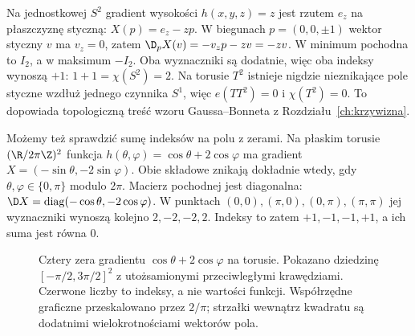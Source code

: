 \begin{przyklad}
Na jednostkowej $S^2$ gradient wysokości $h(x,y,z)=z$
jest rzutem $e_z$ na płaszczyznę styczną:
$X(p)=e_z-zp$. W biegunach $p=(0,0,\pm1)$ wektor
styczny $v$ ma $v_z=0$, zatem
$\D_pX(v)=-v_zp-zv=-zv$.
W minimum pochodna to $I_2$, a w maksimum $-I_2$.
Oba wyznaczniki są dodatnie, więc oba indeksy wynoszą $+1$:
$1+1=\chi(S^2)=2$.
Na torusie $T^2$
istnieje nigdzie
nieznikające pole
styczne wzdłuż
jednego czynnika
$S^1$, więc
$e(TT^2)=0$ i
$\chi(T^2)=0$.
To dopowiada topologiczną
treść wzoru
Gaussa--Bonneta z
Rozdziału~\ref{ch:krzywizna}.

Możemy też sprawdzić sumę indeksów na polu z zerami.
Na płaskim torusie $(\R/2\pi\Z)^2$ funkcja
$h(\theta,\varphi)=\cos\theta+2\cos\varphi$ ma gradient
$X=(-\sin\theta,-2\sin\varphi)$.
Obie składowe znikają dokładnie wtedy, gdy
$\theta,\varphi\in\{0,\pi\}$ modulo $2\pi$.
Macierz pochodnej jest diagonalna:
$\D X=\operatorname{diag}(-\cos\theta,-2\cos\varphi)$.
W punktach $(0,0),(\pi,0),(0,\pi),(\pi,\pi)$
jej wyznaczniki wynoszą kolejno $2,-2,-2,2$.
Indeksy to zatem $+1,-1,-1,+1$, a ich suma jest równa $0$.
\end{przyklad}

\begin{figure}[H]
\centering
{}
\caption{Cztery zera gradientu $\cos\theta+2\cos\varphi$ na torusie.
Pokazano dziedzinę $[-\pi/2,3\pi/2]^2$ z utożsamionymi
przeciwległymi krawędziami. Czerwone liczby to indeksy,
a nie wartości funkcji. Współrzędne graficzne przeskalowano
przez $2/\pi$; strzałki wewnątrz kwadratu są dodatnimi
wielokrotnościami wektorów pola.}
\label{fig:indeksy-torus-21}
\end{figure}

